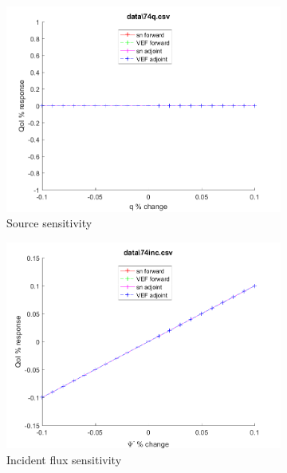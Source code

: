 \documentclass{article}
\begin{document}
\begin{figure}[H]
\label{Case74Sens}
\centering
\begin{subfigure}{.5\textwidth}
  \centering
  \includegraphics[width=.98\linewidth]{IanProposal/figures2/74qSens.png}
  \caption{Source sensitivity}
  \label{fig:sfig1}
\end{subfigure}%
\begin{subfigure}{.5\textwidth}
  \centering
  \includegraphics[width=.98\linewidth]{IanProposal/figures2/74incSens.png}
  \caption{Incident flux sensitivity}
  \label{fig:sfig4}
\end{subfigure}%
\\
\begin{subfigure}{.5\textwidth}
  \centering

\end{subfigure}
\end{figure}
\end{document}
